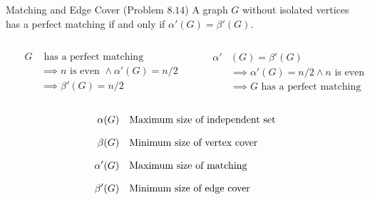 \begin{frame}{}
  \begin{exampleblock}{Matching and Edge Cover (Problem $8.14$)}
    A graph $G$ without isolated vertices has a perfect matching if and only if $\alpha'(G) = \beta'(G)$.
  \end{exampleblock}

  \begin{columns}
      \pause
      \begin{center}
      \end{center}

      \pause
      \vspace{-0.30cm}
      \begin{align*}
	G &\text{ has a perfect matching} \\[5pt]
	&\implies n \text{ is even } \land \alpha'(G) = n/2 \\[5pt]
	&\implies \beta'(G) = n/2 %
      \end{align*}
      \pause
      \begin{center}
      \end{center}

      \pause
      \vspace{-0.30cm}
      \begin{align*}
	\alpha'&(G) = \beta'(G) \\[5pt]
	&\implies \alpha'(G) = n/2 \land n \text{ is even} \\[5pt]
	&\implies G \text{ has a perfect matching}
      \end{align*}
  \end{columns}
\end{frame}

\begin{frame}{}

  \begin{align*}
    \alpha(G) 	& \text{\quad Maximum size of independent set} \\[8pt]
    \beta(G) 	& \text{\quad Minimum size of vertex cover} \\[8pt]
    \alpha'(G)  & \text{\quad Maximum size of matching} \\[8pt]
    \beta'(G) 	& \text{\quad Minimum size of edge cover}
  \end{align*}

\end{frame}

